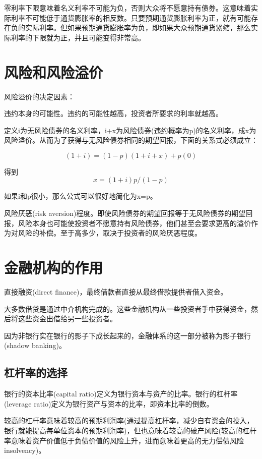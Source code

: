 \documentclass{article}
\begin{document}
零利率下限意味着名义利率不可能为负，否则大众将不愿意持有债券。这意味着实际利率不可能低于通货膨胀率的相反数。只要预期通货膨胀利率为正，就有可能存在负的实际利率。但如果预期通货膨胀率为负，即如果大众预期通货紧缩，那么实际利率的下限就为正，并且可能变得非常高。

\section{风险和风险溢价}

风险溢价的决定因素：

违约本身的可能性。违约的可能性越高，投资者所要求的利率就越高。 

定义i为无风险债券的名义利率，i+x为风险债券(违约概率为p)的名义利率，成x为风险溢价。从而为了获得与无风险债券相同的期望回报，下面的关系式必须成立：

\[
(1+i)=(1-p)(1+i+x)+p(0)
\]

得到
\[
x=(1+i)p/(1-p)
\]

如果i和p很小，那么公式可以很好地简化为x=p。

\hspace*{\fill}

风险厌恶(risk aversion)程度。即使风险债券的期望回报等于无风险债券的期望回报，风险本身也可能使投资者不愿意持有风险债券，他们甚至会要求更高的溢价作为对风险的补偿。至于高多少，取决于投资者的风险厌恶程度。

\section{金融机构的作用}

直接融资(direct finance)，最终借款者直接从最终借款提供者借入资金。

大多数借贷是通过中介机构完成的。这些金融机构从一些投资者手中获得资金，然后将这些资金出借给另一些投资者。

因为非银行实在银行的影子下成长起来的，金融体系的这一部分被称为影子银行(shadow banking)。

\subsection{杠杆率的选择}

银行的资本比率(capital ratio)定义为银行资本与资产的比率。银行的杠杆率(leverage ratio)定义为银行资产与资本的比率，即资本比率的倒数。

较高的杠杆率意味着较高的预期利润率(通过提高杠杆率，减少自有资金的投入，银行就能提高每单位资本的预期利润率)，但也意味着较高的破产风险(较高的杠杆率意味着资产价值低于负债价值的风险上升，进而意味着更高的无力偿债风险insolvency)。
\end{document}
